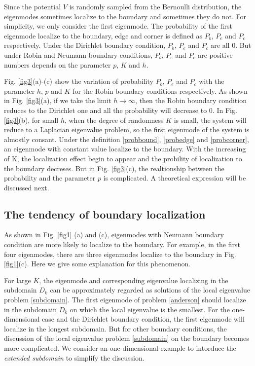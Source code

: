 \documentclass[a4paper,11pt]{article}
\begin{document}
Since the potential $V$ is randomly sampled from the Bernoulli distribution, the eigenmodes sometimes localize to the boundary and sometimes they do not. For simplicity, we only consider the first eigenmode. The probability of the first eigenmode localize to the boundary, edge and corner is defined as $P_b$, $P_e$ and $P_c$ respectively. Under the Dirichlet boundary condition, $P_b$, $P_e$ and $P_c$ are all $0$. But under Robin and Neumann boundary conditions, $P_b$, $P_e$ and $P_c$ are positive numbers depends on the parameter $p$, $K$ and $h$.

Fig. \ref{fig3}(a)-(c) show the variation of probability $P_b$, $P_e$ and $P_c$ with the parameter $h$, $p$ and $K$ for the Robin boundary conditions respectively. As shown in Fig. \ref{fig3}(a), if we take the limit $h \rightarrow \infty$, then the Robin boundary condition reduces to the Dirichlet one and all the probability will decrease to $0$. In Fig. \ref{fig3}(b), for small $h$, when the degree of randomness $K$ is small, the system will reduce to a Laplacian eigenvalue problem, so the first eigenmode of the system is almostly consant. Under the definition \eqref{probbound}, \eqref{probedge} and \eqref{probcorner}, an eigenmode with constant value localize to the boundary. With the increasing of K, the localization effect begin to appear and the probility of localization to the boundary decreses. But in Fig. \ref{fig3}(c), the realtionship between the probability and the parameter $p$ is complicated. A theoretical expression will be discussed next.

\subsection{The tendency of boundary localization}

As shown in Fig. \ref{fig1} (a) and (c), eigenmodes with Neumann boundary condition are more likely to localize to the boundary. For example, in the first four eigenmodes, there are three eigenmodes localize to the boundary in Fig. \ref{fig1}(c). Here we give some explanation for this phenomenon.

For large $K$, the eigenmode and corresponding eigenvalue localizing in the subdomain $D_k$ can be approximately regarded as solutions of the local eigenvalue problem \eqref{subdomain}. The first eigenmode of problem \eqref{anderson} should localize in the subdomain $D_k$ on which the local eigenvalue is the smallest. For the one-dimensional case and the Dirichlet boundary condition, the first eigenmode will localize in the longest subdomain. But for other boundary conditions, the discussion of the local eigenvalue problem \eqref{subdomain} on the boundary becomes more complicated. We consider an one-dimensional example to intorduce the \emph{extended subdomain} to simplify the discussion.
\end{document}
